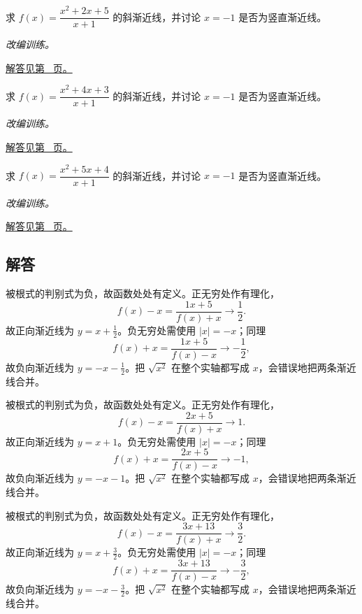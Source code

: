 \documentclass[UTF8,12pt,a4paper,fontset=fandol]{ctexart}
\begin{document}
\begin{example}[多项式除法求渐近线]\label{ex:c4q22}
求 $f(x)=\dfrac{x^2+2x+5}{x+1}$ 的斜渐近线，并讨论 $x=-1$ 是否为竖直渐近线。
\par\textit{改编训练。}\par\hyperref[ans:c4q22]{解答见第~\pageref{ans:c4q22} 页。}
\end{example}
\begin{example}[多项式除法求渐近线]\label{ex:c4q23}
求 $f(x)=\dfrac{x^2+4x+3}{x+1}$ 的斜渐近线，并讨论 $x=-1$ 是否为竖直渐近线。
\par\textit{改编训练。}\par\hyperref[ans:c4q23]{解答见第~\pageref{ans:c4q23} 页。}
\end{example}
\begin{example}[多项式除法求渐近线]\label{ex:c4q24}
求 $f(x)=\dfrac{x^2+5x+4}{x+1}$ 的斜渐近线，并讨论 $x=-1$ 是否为竖直渐近线。
\par\textit{改编训练。}\par\hyperref[ans:c4q24]{解答见第~\pageref{ans:c4q24} 页。}
\end{example}
\subsection{解答}
\begin{solve}\label{ans:c4q1}
被根式的判别式为负，故函数处处有定义。正无穷处作有理化，
\[
f(x)-x=\frac{1x+5}{f(x)+x}\longrightarrow \frac{1}{2}.
\]
故正向渐近线为 $y=x+\frac{1}{2}$。负无穷处需使用 $|x|=-x$；同理
\[
f(x)+x=\frac{1x+5}{f(x)-x}\longrightarrow-\frac{1}{2},
\]
故负向渐近线为 $y=-x-\frac{1}{2}$。把 $\sqrt{x^2}$ 在整个实轴都写成 $x$，会错误地把两条渐近线合并。
\end{solve}

\begin{solve}\label{ans:c4q2}
被根式的判别式为负，故函数处处有定义。正无穷处作有理化，
\[
f(x)-x=\frac{2x+5}{f(x)+x}\longrightarrow 1.
\]
故正向渐近线为 $y=x+1$。负无穷处需使用 $|x|=-x$；同理
\[
f(x)+x=\frac{2x+5}{f(x)-x}\longrightarrow-1,
\]
故负向渐近线为 $y=-x-1$。把 $\sqrt{x^2}$ 在整个实轴都写成 $x$，会错误地把两条渐近线合并。
\end{solve}

\begin{solve}\label{ans:c4q3}
被根式的判别式为负，故函数处处有定义。正无穷处作有理化，
\[
f(x)-x=\frac{3x+13}{f(x)+x}\longrightarrow \frac{3}{2}.
\]
故正向渐近线为 $y=x+\frac{3}{2}$。负无穷处需使用 $|x|=-x$；同理
\[
f(x)+x=\frac{3x+13}{f(x)-x}\longrightarrow-\frac{3}{2},
\]
故负向渐近线为 $y=-x-\frac{3}{2}$。把 $\sqrt{x^2}$ 在整个实轴都写成 $x$，会错误地把两条渐近线合并。
\end{solve}
\end{document}
